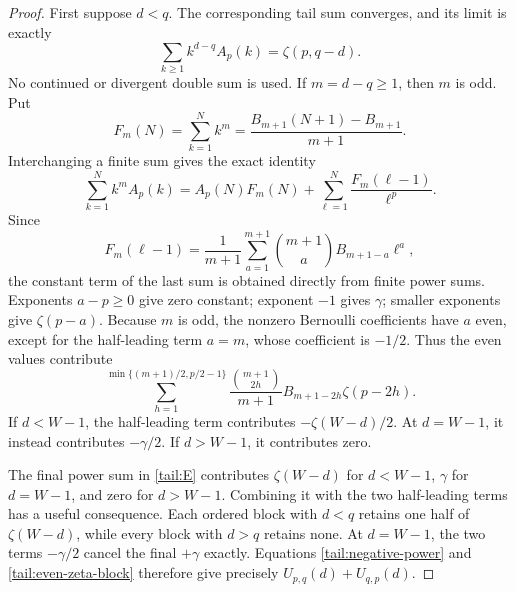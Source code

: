 \documentclass[11pt,a4paper]{article}
\numberwithin{equation}{section}
\theoremstyle{definition}
\theoremstyle{remark}
\begin{document}
\begin{proof}
First suppose \(d<q\). The corresponding tail sum converges, and
its limit is exactly
\begin{equation}\label{tail:negative-power}
 \sum_{k\ge1}k^{d-q}A_p(k)=\zeta(p,q-d).
\end{equation}
No continued or divergent double sum is used. If \(m=d-q\ge1\),
then \(m\) is odd. Put
\[
 F_m(N)=\sum_{k=1}^{N}k^m
       =\frac{B_{m+1}(N+1)-B_{m+1}}{m+1}.
\]
Interchanging a finite sum gives the exact identity
\begin{equation}\label{tail:Faulhaber-change}
 \sum_{k=1}^{N}k^mA_p(k)
 =A_p(N)F_m(N)
   +\sum_{\ell=1}^{N}\frac{F_m(\ell-1)}{\ell^p}.
\end{equation}
Since
\[
 F_m(\ell-1)=\frac1{m+1}
    \sum_{a=1}^{m+1}\binom{m+1}{a}B_{m+1-a}\ell^a,
\]
the constant term of the last sum is obtained directly from finite
power sums. Exponents \(a-p\ge0\) give zero constant; exponent
\(-1\) gives \(\gamma\); smaller exponents give \(\zeta(p-a)\).
Because \(m\) is odd, the nonzero Bernoulli coefficients have
\(a\) even, except for the half-leading term \(a=m\), whose
coefficient is \(-1/2\). Thus the even values contribute
\begin{equation}\label{tail:even-zeta-block}
 \sum_{h=1}^{\min\{(m+1)/2,p/2-1\}}
 \frac{\binom{m+1}{2h}}{m+1}B_{m+1-2h}\zeta(p-2h).
\end{equation}
If \(d<W-1\), the half-leading term contributes
\(-\zeta(W-d)/2\). At \(d=W-1\), it instead contributes
\(-\gamma/2\). If \(d>W-1\), it contributes zero.

The final power sum in \eqref{tail:E} contributes
\(\zeta(W-d)\) for \(d<W-1\), \(\gamma\) for \(d=W-1\), and
zero for \(d>W-1\). Combining it with the two half-leading terms
has a useful consequence. Each ordered block with \(d<q\) retains
one half of \(\zeta(W-d)\), while every block with \(d>q\)
retains none. At \(d=W-1\), the two terms \(-\gamma/2\) cancel
the final \(+\gamma\) exactly. Equations
\eqref{tail:negative-power} and \eqref{tail:even-zeta-block}
therefore give precisely \(U_{p,q}(d)+U_{q,p}(d)\).


\end{proof}
\end{document}
